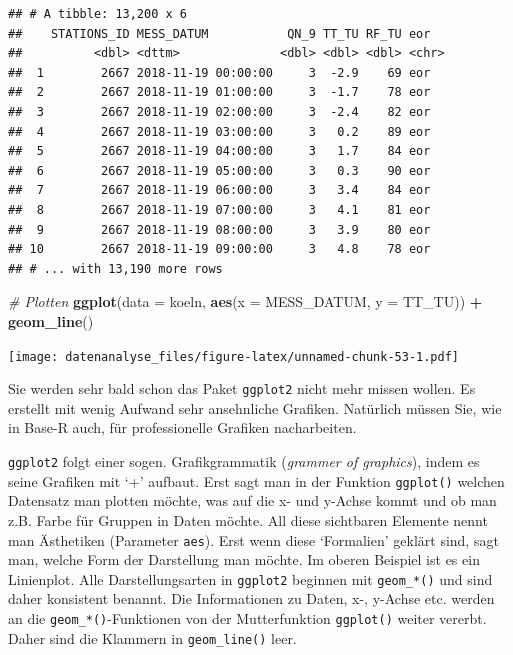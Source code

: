 \documentclass[]{book}
\newenvironment{Shaded}{\begin{snugshade}}{\end{snugshade}}
\newcommand{\CommentTok}[1]{\textcolor[rgb]{0.56,0.35,0.01}{\textit{#1}}}
\newcommand{\DataTypeTok}[1]{\textcolor[rgb]{0.13,0.29,0.53}{#1}}
\newcommand{\KeywordTok}[1]{\textcolor[rgb]{0.13,0.29,0.53}{\textbf{#1}}}
\newcommand{\NormalTok}[1]{#1}
\newcommand{\OperatorTok}[1]{\textcolor[rgb]{0.81,0.36,0.00}{\textbf{#1}}}
\newcommand{\StringTok}[1]{\textcolor[rgb]{0.31,0.60,0.02}{#1}}
\begin{document}
\begin{verbatim}
## # A tibble: 13,200 x 6
##    STATIONS_ID MESS_DATUM           QN_9 TT_TU RF_TU eor  
##          <dbl> <dttm>              <dbl> <dbl> <dbl> <chr>
##  1        2667 2018-11-19 00:00:00     3  -2.9    69 eor  
##  2        2667 2018-11-19 01:00:00     3  -1.7    78 eor  
##  3        2667 2018-11-19 02:00:00     3  -2.4    82 eor  
##  4        2667 2018-11-19 03:00:00     3   0.2    89 eor  
##  5        2667 2018-11-19 04:00:00     3   1.7    84 eor  
##  6        2667 2018-11-19 05:00:00     3   0.3    90 eor  
##  7        2667 2018-11-19 06:00:00     3   3.4    84 eor  
##  8        2667 2018-11-19 07:00:00     3   4.1    81 eor  
##  9        2667 2018-11-19 08:00:00     3   3.9    80 eor  
## 10        2667 2018-11-19 09:00:00     3   4.8    78 eor  
## # ... with 13,190 more rows
\end{verbatim}

\begin{Shaded}
\begin{Highlighting}[]
\CommentTok{# Plotten}
\KeywordTok{ggplot}\NormalTok{(}\DataTypeTok{data =}\NormalTok{ koeln, }\KeywordTok{aes}\NormalTok{(}\DataTypeTok{x =}\NormalTok{ MESS_DATUM, }\DataTypeTok{y =}\NormalTok{ TT_TU)) }\OperatorTok{+}\StringTok{ }
\StringTok{  }\KeywordTok{geom_line}\NormalTok{()}
\end{Highlighting}
\end{Shaded}

\texttt{[image: datenanalyse\_files/figure-latex/unnamed-chunk-53-1.pdf]}

Sie werden sehr bald schon das Paket \texttt{ggplot2} nicht mehr missen wollen. Es erstellt mit wenig Aufwand sehr ansehnliche Grafiken. Natürlich müssen Sie, wie in Base-R auch, für professionelle Grafiken nacharbeiten.

\texttt{ggplot2} folgt einer sogen. Grafikgrammatik (\emph{grammer of graphics}), indem es seine Grafiken mit `+' aufbaut. Erst sagt man in der Funktion \texttt{ggplot()} welchen Datensatz man plotten möchte, was auf die x- und y-Achse kommt und ob man z.B. Farbe für Gruppen in Daten möchte. All diese sichtbaren Elemente nennt man Ästhetiken (Parameter \texttt{aes}). Erst wenn diese `Formalien' geklärt sind, sagt man, welche Form der Darstellung man möchte. Im oberen Beispiel ist es ein Linienplot. Alle Darstellungsarten in \texttt{ggplot2} beginnen mit \texttt{geom\_*()} und sind daher konsistent benannt. Die Informationen zu Daten, x-, y-Achse etc. werden an die \texttt{geom\_*()}-Funktionen von der Mutterfunktion \texttt{ggplot()} weiter vererbt. Daher sind die Klammern in \texttt{geom\_line()} leer.
\end{document}
